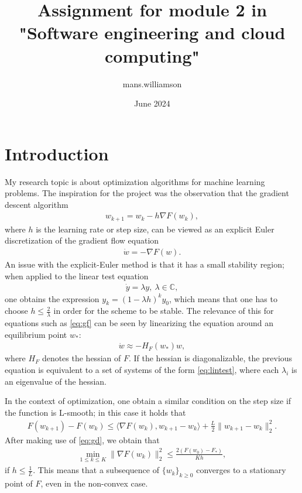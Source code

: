 \documentclass{article}
\title{Assignment for module 2 in "Software engineering and cloud computing"}
\author{mans.williamson }
\date{June 2024}
\begin{document}
\maketitle

\section{Introduction}

My research topic is about optimization algorithms for machine learning problems. The inspiration for the project was the observation that the gradient descent algorithm
\begin{align}\label{eq:gd}
w_{k+1} = w_k - h \nabla F(w_k),
\end{align}
where $h$ is the learning rate or step size, can be viewed as an explicit Euler discretization of the gradient flow equation
\begin{align}\label{eq:gf}
\dot{w} = - \nabla F(w).
\end{align}
An issue with the explicit-Euler method is that it has a small stability region; when applied to the linear test equation
\begin{align}\label{eq:lintest}
\dot{y} = \lambda y, \ \lambda \in \mathbb{C},
\end{align}
one obtains the expression $y_{k} = (1-\lambda h)^k y_0$, which means that one has to choose $h \leq \frac{2}{\lambda}$ in order for the scheme to be stable. The relevance of this for equations such as
\eqref{eq:gf} can be seen by linearizing the equation around an equilibrium point $w_*$:
\begin{align}\label{eq:gf}
\dot{w} \approx -H_F(w_*)w,
\end{align}
where $H_F$ denotes the hessian of $F$. If the hessian is diagonalizable, the previous equation is equivalent to a set of systems of the form \eqref{eq:lintest}, where each $\lambda_i$ is an eigenvalue of the hessian.

In the context of optimization, one obtain a similar condition on the step size if the function is L-smooth; in this case it holds that
\begin{align*}
F(w_{k+1}) - F(w_k) \leq \langle \nabla F(w_k), w_{k+1} - w_k \rangle + \frac{L}{2}\lVert w_{k+1} - w_k \rVert_2^2.
\end{align*}
After making use of \eqref{eq:gd}, we obtain that
\begin{align*}
\min_{1 \leq k \leq K} \lVert \nabla F(w_k) \rVert_2^2  \leq \frac{2 \left( F(w_0) -F_* \right)}{Kh},
\end{align*}
if $h \leq \frac{1}{L}$. This means that a subsequence of $\{w_k\}_{k \geq 0}$ converges to a stationary point of $F$, even in the non-convex case.
\end{document}
